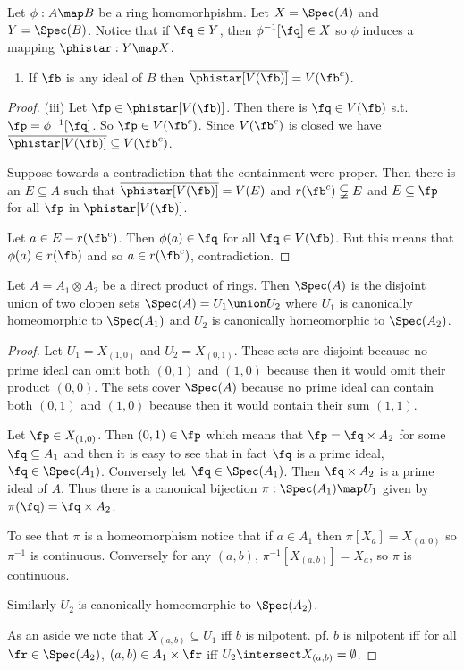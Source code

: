 \documentclass[oneside,12pt]{amsart}
\begin{document}
\begin{exercise}[exercise 21]Let $\phi:A\map B$ be a ring homomorhpishm. Let $X=\Spec(A)$
and $Y=\Spec(B)$. Notice that if $\fq\in Y$, then $\phi^{-1}[\fq]\in X$ so $\phi$ induces a mapping
$\phistar:Y\map X$.
\begin{enumerate}
\item[(iii)] If $\fb$ is any ideal of $B$ then $\overline{\phistar[V(\fb)]} = V(\fb^c)$.
\end{enumerate}
\end{exercise}
\begin{proof}
(iii) Let $\fp\in \phistar[V(\fb)]$. Then there is $\fq\in V(\fb)$ s.t.
$\fp=\phi^{-1}[\fq]$. So $\fp\in V(\fb^c)$. Since $V(\fb^c)$ is closed we have
$\overline{\phistar[V(\fb)]} \subseteq V(\fb^c)$.

Suppose towards a contradiction that the containment were proper.
Then there is an $E\subseteq A$
such that $\overline{\phistar[V(\fb)]} = V(E)$ and $r(\fb^c) \subsetneqq E$
and $E\subseteq\fp$ for all $\fp$ in $\phistar[V(\fb)]$.

Let $a\in E - r(\fb^c)$. Then $\phi(a)\in\fq$ for all $\fq\in V(\fb)$. But this means that
$\phi(a)\in r(\fb)$ and so $a\in r(\fb^c)$, contradiction.
\end{proof}

\begin{exercise}[exercise 22] Let $A = A_1 \otimes A_2$ be a direct product of rings.
Then $\Spec(A)$ is the disjoint union of two clopen sets $\Spec(A) = U_1 \union U_2$
where $U_1$ is canonically homeomorphic to $\Spec(A_1)$ and $U_2$ is canonically
homeomorphic to $\Spec(A_2)$.
\end{exercise}
\begin{proof}
Let $U_1=X_{(1,0)}$ and $U_2=X_{(0, 1)}$. These sets are disjoint because no prime ideal
can omit both $(0, 1)$ and $(1,0)$ because then it would omit their product $(0, 0)$.
The sets cover $\Spec(A)$ because no prime ideal can contain both $(0, 1)$ and
$(1, 0)$ because then it would contain their sum $(1, 1)$.

Let $\fp\in X_{(1, 0)}$.
Then $(0, 1) \in \fp$ which means that $\fp = \fq \times A_2$ for some $\fq \subseteq A_1$ and then
it is easy to see that in fact $\fq$ is a prime ideal, $\fq \in \Spec(A_1)$.
Conversely let $\fq \in \Spec(A_1)$. Then $\fq \times A_2$ is a prime ideal of $A$.
Thus there is a canonical bijection $\pi:\Spec(A_1) \map U_1$ given by
$\pi(\fq) = \fq \times A_2$.

To see that $\pi$ is a homeomorphism notice that if $a\in A_1$ then $\pi[X_a]=X_{(a, 0)}$ so
$\pi^{-1}$ is continuous. Conversely for any $(a, b)$, $\pi^{-1}[X_{(a,b)}] = X_a$, so $\pi$  is continuous.

Similarly $U_2$ is canonically homeomorphic to $\Spec(A_2)$.

As an aside we note that $X_{(a, b)} \subseteq U_1$ iff $b$ is nilpotent. pf. $b$ is nilpotent iff
for all $\fr\in\Spec(A_2)$, $(a,b)\in A_1 \times \fr$ iff $U_2 \intersect X_{(a,b)}=\emptyset$.
\end{proof}
\end{document}
